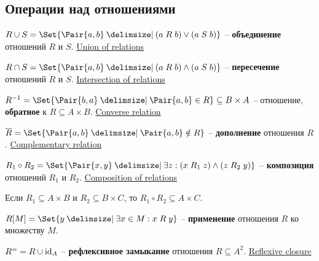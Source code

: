 \documentclass[a4paper,10pt]{article}
\begin{document}
\subsection{Операции над отношениями}

\begin{terms}
    \item $R \union S = \Set{\Pair{a,b} \given (a \rel[R] b) \lor (a \rel[S] b)}$ \--- \textbf{объединение} отношений $R$ и $S$.
    \hfill\href{https://en.wikipedia.org/wiki/Binary_relation#Union}{Union of relations}

    \item $R \intersection S = \Set{\Pair{a,b} \given (a \rel[R] b) \land (a \rel[S] b)}$ \--- \textbf{пересечение} отношений $R$ и $S$.
    \hfill\href{https://en.wikipedia.org/wiki/Binary_relation#Intersection}{Intersection of relations}

    \item $R^{-1} = \Set{\Pair{b,a} \given \Pair{a,b} \in R} \subseteq B \times A$ \--- отношение, \textbf{обратное} к $R \subseteq A \times B$.
    \hfill\href{https://en.wikipedia.org/wiki/Converse_relation}{Converse relation}

    \item $\overline{R} = \Set{\Pair{a,b} \given \Pair{a,b} \notin R}$ \--- \textbf{дополнение} отношения $R$.
    \hfill\href{https://en.wikipedia.org/wiki/Complement_(set_theory)\#Complementary_relation}{Complementary relation}

    \item $R_1 \circ R_2 = \Set{\Pair{x,y} \given \exists z : (x \rel[R_1] z) \land (z \rel[R_2] y)}$ \--- \textbf{композиция} отношений $R_1$ и $R_2$.
    \hfill\href{https://en.wikipedia.org/wiki/Composition_of_relations}{Composition of relations}
    \begin{terms}
        \item Если $R_1 \subseteq A \times B$ и $R_2 \subseteq B \times C$, то $R_1 \circ R_2 \subseteq A \times C$.
    \end{terms}

    \item $R[M] = \Set{y \given \exists x \in M : x \rel y}$ \--- \textbf{применение} отношения $R$ ко множеству $M$.

    \item $R^{=} = R \cup \mathrm{id}_{A}$ \--- \textbf{рефлексивное замыкание} отношения $R \subseteq A^2$.
    \hfill\href{https://en.wikipedia.org/wiki/Reflexive_closure}{Reflexive closure}


\end{terms}
\end{document}

